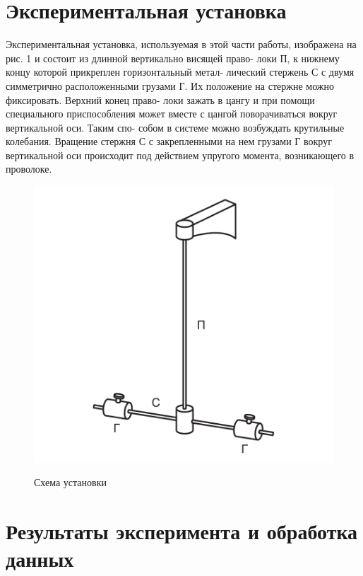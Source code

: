\documentclass[a4paper,12pt]{article} %
\begin{document}
\section{Экспериментальная установка}

Экспериментальная установка, используемая в этой части работы,
изображена на рис. 1 и состоит из длинной вертикально висящей право-
локи П, к нижнему концу которой прикреплен горизонтальный метал-
лический стержень С с двумя симметрично расположенными грузами
Г. Их положение на стержне можно фиксировать. Верхний конец право-
локи зажать в цангу и при помощи специального приспособления может
вместе с цангой поворачиваться вокруг вертикальной оси. Таким спо-
собом в системе можно возбуждать крутильные колебания. Вращение
стержня С с закрепленными на нем грузами Г вокруг вертикальной
оси происходит под действием упругого момента, возникающего в проволоке.

\begin{figure}[!h]
    \begin{center}
        \includegraphics[scale=0.7]{ystanovka.png}
        \begin{center}
        \caption{Схема установки}
        \end{center}
        \label{graphic1b}
    \end{center}
\end{figure}

\section{Результаты эксперимента и обработка данных}
\end{document}

